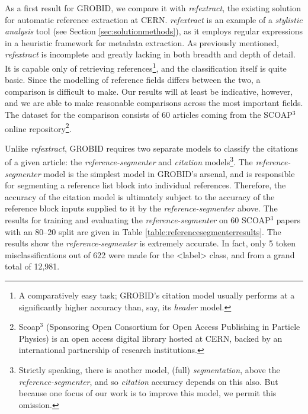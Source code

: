 As a first result for GROBID, we compare it with \emph{refextract}, the existing solution for automatic reference extraction at CERN. \emph{refextract} is an example of a \emph{stylistic analysis} tool (see Section \ref{sec:solutionmethods}), as it employs regular expressions in a heuristic framework for metadata extraction. As previously mentioned, \emph{refextract} is incomplete and greatly lacking in both breadth and depth of detail. It is capable only of retrieving references\footnote{A comparatively easy task; GROBID's citation model usually performs at a significantly higher accuracy than, say, its \emph{header} model.}, and the classification itself is quite basic. Since the modelling of reference fields differs between the two, a comparison is difficult to make. Our results will at least be indicative, however, and we are able to make reasonable comparisons across the most important fields. The dataset for the comparison consists of 60 articles coming from the SCOAP$^3$ online repository\footnote{Scoap$^3$ (Sponsoring Open Consortium for Open Access Publishing in Particle Physics) is an open access digital library hosted at CERN, backed by an international partnership of research institutions.}.

Unlike \emph{refextract}, GROBID requires two separate models to classify the citations of a given article: the \emph{reference-segmenter} and \emph{citation} models\footnote{Strictly speaking, there is another model, (full) \emph{segmentation}, above the \emph{reference-segmenter}, and so \emph{citation} accuracy depends on this also. But because one focus of our work is to improve this model, we permit this omission.}. The \emph{reference-segmenter} model is the simplest model in GROBID's arsenal, and is responsible for segmenting a reference list block into individual references. Therefore, the accuracy of the citation model is ultimately subject to the accuracy of the reference block inputs supplied to it by the \emph{reference-segmenter} above. The results for training and evaluating the \emph{reference-segmenter} on 60 SCOAP$^3$ papers with an 80--20 split are given in Table \ref{table:referencesegmenterresults}. The results show the \emph{reference-segmenter} is extremely accurate. In fact, only 5 token misclassifications out of 622 were made for the <label> class, and from a grand total of 12,981.

